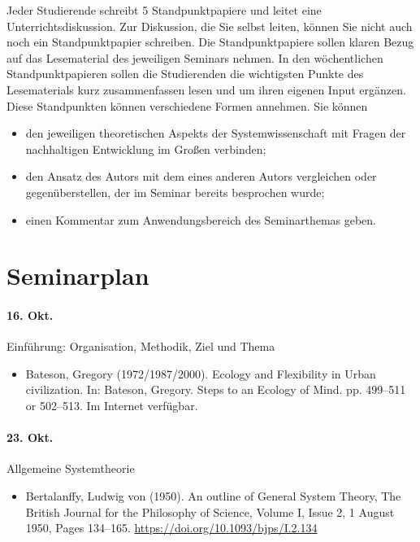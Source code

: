 \documentclass[11pt,a4paper]{article}
\begin{document}
Jeder Studierende schreibt 5 Standpunktpapiere und leitet eine
Unterrichtsdiskussion.  Zur Diskussion, die Sie selbst leiten, können Sie
nicht auch noch ein Standpunktpapier schreiben. Die Standpunktpapiere sollen
klaren Bezug auf das Lesematerial des jeweiligen Seminars nehmen. In den
wöchentlichen Standpunktpapieren sollen die Studierenden die wichtigsten
Punkte des Lesematerials kurz zusammenfassen lesen und um ihren eigenen Input
ergänzen. Diese Standpunkten können verschiedene Formen annehmen. Sie können
\begin{itemize}
\item den jeweiligen theoretischen Aspekts der Systemwissenschaft mit Fragen
  der nachhaltigen Entwicklung im Großen verbinden;
\item den Ansatz des Autors mit dem eines anderen Autors vergleichen oder
  gegenüberstellen, der im Seminar bereits besprochen wurde;
\item einen Kommentar zum Anwendungsbereich des Seminarthemas geben.
\end{itemize}

\section{Seminarplan}

\paragraph{16. Okt.}
Einführung: Organisation, Methodik, Ziel und Thema
\begin{itemize}
\item Bateson, Gregory (1972/1987/2000). Ecology and Flexibility in Urban
  civilization. In: Bateson, Gregory. Steps to an Ecology of Mind.
  pp. 499--511 or 502–513. Im Internet verfügbar.
\end{itemize}

\paragraph{23. Okt.}
Allgemeine Systemtheorie
\begin{itemize}
\item Bertalanffy, Ludwig von (1950). An outline of General System Theory,
  The British Journal for the Philosophy of Science, Volume I, Issue 2, 1
  August 1950, Pages 134–165. \url{https://doi.org/10.1093/bjps/I.2.134}
\end{itemize}
\end{document}
